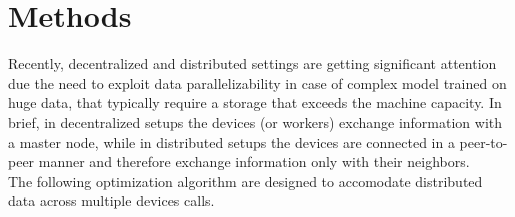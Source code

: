 \section{Methods}
Recently, decentralized and distributed settings are getting significant attention due the need to exploit data parallelizability in case of complex model trained on huge data, that typically require a storage that exceeds the machine capacity. In brief, in decentralized setups the devices (or workers) exchange information with a master node, while in distributed setups the devices are connected in a peer-to-peer manner and therefore exchange information only with their neighbors. \\ 
The following optimization algorithm are designed to accomodate distributed data across multiple devices calls.